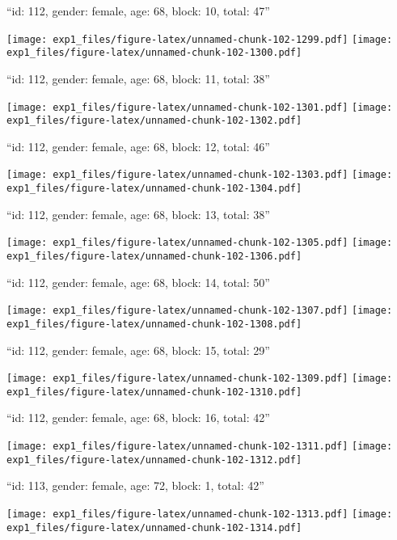 \documentclass[11pt,,]{article}
\begin{document}
\newpage
[1] 

``id: 112, gender: female, age: 68, block: 10, total: 47''

\texttt{[image: exp1\_files/figure-latex/unnamed-chunk-102-1299.pdf]}
\texttt{[image: exp1\_files/figure-latex/unnamed-chunk-102-1300.pdf]}

\newpage
[1] 

``id: 112, gender: female, age: 68, block: 11, total: 38''

\texttt{[image: exp1\_files/figure-latex/unnamed-chunk-102-1301.pdf]}
\texttt{[image: exp1\_files/figure-latex/unnamed-chunk-102-1302.pdf]}

\newpage
[1] 

``id: 112, gender: female, age: 68, block: 12, total: 46''

\texttt{[image: exp1\_files/figure-latex/unnamed-chunk-102-1303.pdf]}
\texttt{[image: exp1\_files/figure-latex/unnamed-chunk-102-1304.pdf]}

\newpage
[1] 

``id: 112, gender: female, age: 68, block: 13, total: 38''

\texttt{[image: exp1\_files/figure-latex/unnamed-chunk-102-1305.pdf]}
\texttt{[image: exp1\_files/figure-latex/unnamed-chunk-102-1306.pdf]}

\newpage
[1] 

``id: 112, gender: female, age: 68, block: 14, total: 50''

\texttt{[image: exp1\_files/figure-latex/unnamed-chunk-102-1307.pdf]}
\texttt{[image: exp1\_files/figure-latex/unnamed-chunk-102-1308.pdf]}

\newpage
[1] 

``id: 112, gender: female, age: 68, block: 15, total: 29''

\texttt{[image: exp1\_files/figure-latex/unnamed-chunk-102-1309.pdf]}
\texttt{[image: exp1\_files/figure-latex/unnamed-chunk-102-1310.pdf]}

\newpage
[1] 

``id: 112, gender: female, age: 68, block: 16, total: 42''

\texttt{[image: exp1\_files/figure-latex/unnamed-chunk-102-1311.pdf]}
\texttt{[image: exp1\_files/figure-latex/unnamed-chunk-102-1312.pdf]}

\newpage
[1] 

``id: 113, gender: female, age: 72, block: 1, total: 42''

\texttt{[image: exp1\_files/figure-latex/unnamed-chunk-102-1313.pdf]}
\texttt{[image: exp1\_files/figure-latex/unnamed-chunk-102-1314.pdf]}
\end{document}
